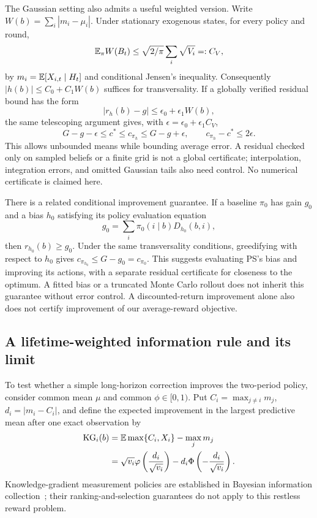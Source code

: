 The Gaussian setting also admits a useful weighted version. Write $W(b)=\sum_i|m_i-\mu_i|$. Under stationary exogenous states, for every policy and round,
\begin{equation}
\mathbb E_\pi W(B_t)\leq\sqrt{2/\pi}\sum_i\sqrt{V_i}=:C_V,
\label{predictive_ar1:eq:belief-moment}
\end{equation}
by $m_i=\mathbb E[X_{i,t}\mid H_t]$ and conditional Jensen's inequality. Consequently $|h(b)|\leq C_0+C_1W(b)$ suffices for transversality. If a globally verified residual bound has the form
\begin{equation}
|r_h(b)-g|\leq\epsilon_0+\epsilon_1W(b),
\end{equation}
the same telescoping argument gives, with $\epsilon=\epsilon_0+\epsilon_1C_V$,
\begin{equation}
G-g-\epsilon\leq c^*\leq c_{\pi_h}\leq G-g+\epsilon,
\qquad c_{\pi_h}-c^*\leq2\epsilon.
\end{equation}
This allows unbounded means while bounding average error. A residual checked only on sampled beliefs or a finite grid is not a global certificate; interpolation, integration errors, and omitted Gaussian tails also need control. No numerical certificate is claimed here.

There is a related conditional improvement guarantee. If a baseline $\pi_0$ has gain $g_0$ and a bias $h_0$ satisfying its policy evaluation equation
\[
g_0=\sum_i\pi_0(i\mid b)D_{h_0}(b,i),
\]
then $r_{h_0}(b)\geq g_0$. Under the same transversality conditions, greedifying with respect to $h_0$ gives $c_{\pi_{h_0}}\leq G-g_0=c_{\pi_0}$. This suggests evaluating PS's bias and improving its actions, with a separate residual certificate for closeness to the optimum. A fitted bias or a truncated Monte Carlo rollout does not inherit this guarantee without error control. A discounted-return improvement alone also does not certify improvement of our average-reward objective.

\subsection{A lifetime-weighted information rule and its limit}
\label{predictive_ar1:sec:long-kg}
To test whether a simple long-horizon correction improves the two-period policy, consider common mean $\mu$ and common $\phi\in[0,1)$. Put $C_i=\max_{j\ne i}m_j$, $d_i=|m_i-C_i|$, and define the expected improvement in the largest predictive mean after one exact observation by
\begin{align}
\mathrm{KG}_i(b)
&=\mathbb E\max\{C_i,X_i\}-\max_jm_j\nonumber\\
&=\sqrt{v_i}\varphi\left(\frac{d_i}{\sqrt{v_i}}\right)
-d_i\Phi\left(-\frac{d_i}{\sqrt{v_i}}\right).
\label{predictive_ar1:eq:kg}
\end{align}
Knowledge-gradient measurement policies are established in Bayesian information collection~\cite{collected30}; their ranking-and-selection guarantees do not apply to this restless reward problem.

